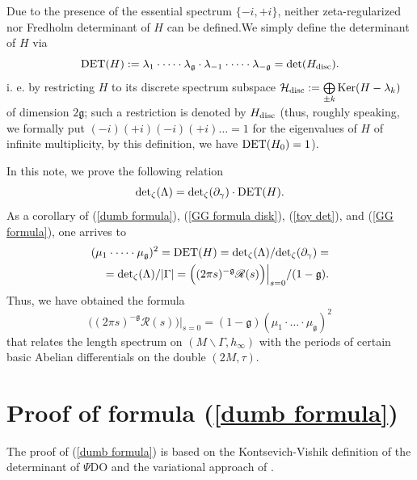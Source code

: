 \documentclass{amsart}
\begin{document}
Due to the presence of the essential spectrum $\{-i,+i\}$, neither zeta-regularized nor Fredholm determinant of $H$ can be defined.We simply define  the determinant of $H$ via
\begin{equation}
\label{toy det}
{\rm DET}(H):=\lambda_1\cdot\dots\cdot\lambda_{\mathfrak{g}}\cdot\lambda_{-1}\cdot\dots\cdot\lambda_{-\mathfrak{g}}={\rm det}(H_{\rm disc}).
\end{equation}
i. e. by restricting $H$ to its discrete spectrum subspace $\mathcal{H}_{\rm disc}:=\bigoplus\limits_{\pm k}{\rm Ker}(H-\lambda_k)$ of dimension $2\mathfrak{g}$; such a restriction is denoted by $H_{\rm disc}$ (thus, roughly speaking, we formally put $(-i)(+i)(-i)(+i)\dots=1$ for the eigenvalues of $H$ of infinite multiplicity, by this definition, we have ${\rm DET}(H_0)=1$).

\smallskip

In this note, we prove the following relation 
\begin{equation}
\label{dumb formula}
{\rm det}_\zeta(\Lambda)={\rm det}_\zeta(\partial_\gamma)\cdot{\rm DET}(H).
\end{equation}
As a corollary of (\ref{dumb formula}), (\ref{GG formula disk}), (\ref{toy det}), and (\ref{GG formula}), one arrives to
\begin{align*}
(\mu_1\cdot\dots\cdot\mu_{\mathfrak{g}})^2={\rm DET}(H)={\rm det}_\zeta(\Lambda)/{\rm det}_\zeta(\partial_\gamma)=\\
={\rm det}_\zeta(\Lambda)/|\Gamma|=\Big((2\pi s)^{-\mathfrak{g}}\mathscr{R}(s)\Big)\Big|_{s=0}/(1-\mathfrak{g}).
\end{align*}
Thus, we have obtained the formula
\begin{equation}
\label{KoKoFormula}
\Big((2\pi s)^{-\mathfrak{g}}\mathscr{R}(s)\Big)\Big|_{s=0}=(1-\mathfrak{g})(\mu_1\cdot\dots\cdot\mu_{\mathfrak{g}})^2
\end{equation}
that relates the length spectrum on $(M\backslash\Gamma,h_\infty)$ with the periods of certain basic Abelian differentials on the double $(2M,\tau)$. 

\section*{Proof of formula (\ref{dumb formula})}
The proof of (\ref{dumb formula}) is based on the Kontsevich-Vishik definition of the determinant of $\Psi$DO and the  variational approach of \cite{Ww,F}.
\end{document}
